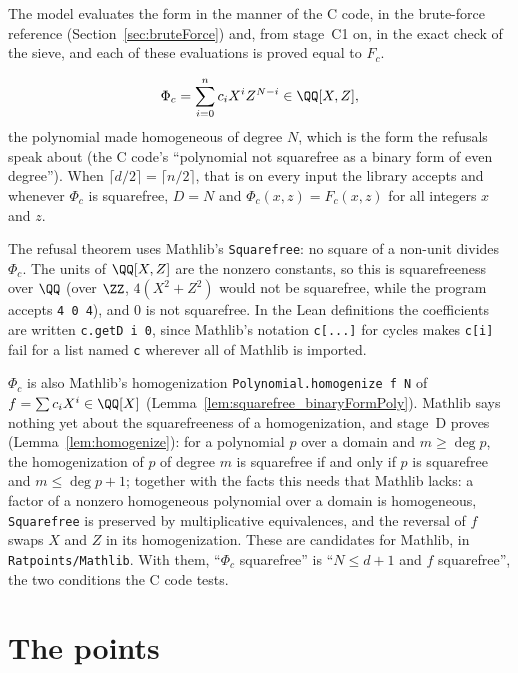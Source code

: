 The model evaluates the form in the manner of the C code, in the brute-force reference
(Section~\ref{sec:bruteForce}) and, from stage~C1 on, in the exact check of the sieve, and each of
these evaluations is proved equal to $F_c$.

\begin{definition}\label{def:binaryFormPoly}
  \leanok
  \[ \Phi_c = \sum_{i=0}^{n} c_i X^i Z^{N-i} \in \QQ[X, Z], \]
  the polynomial made homogeneous of degree $N$, which is the form the refusals speak about (the
  C code's ``polynomial not squarefree as a binary form of even degree''). When
  $\lceil d/2 \rceil = \lceil n/2 \rceil$, that is on every input the library accepts and whenever
  $\Phi_c$ is squarefree, $D = N$ and $\Phi_c(x, z) = F_c(x, z)$ for all integers $x$ and $z$.
\end{definition}

The refusal theorem uses Mathlib's \verb|Squarefree|: no square of a non-unit divides $\Phi_c$. The
units of $\QQ[X, Z]$ are the nonzero constants, so this is squarefreeness over $\QQ$ (over $\ZZ$,
$4(X^2 + Z^2)$ would not be squarefree, while the program accepts \verb|4 0 4|), and $0$ is not
squarefree. In the Lean definitions the coefficients are written \verb|c.getD i 0|, since Mathlib's
notation \verb|c[...]| for cycles makes \verb|c[i]| fail for a list named \verb|c| wherever all of
Mathlib is imported.

$\Phi_c$ is also Mathlib's homogenization \verb|Polynomial.homogenize f N| of
$f = \sum c_i X^i \in \QQ[X]$ (Lemma~\ref{lem:squarefree_binaryFormPoly}). Mathlib says nothing yet
about the squarefreeness of a homogenization, and stage~D proves (Lemma~\ref{lem:homogenize}): for a
polynomial $p$ over a domain and $m \ge \deg p$, the homogenization of $p$ of degree $m$ is
squarefree if and only if $p$ is squarefree and $m \le \deg p + 1$; together with the facts this
needs that Mathlib lacks: a factor of a nonzero homogeneous polynomial over a domain is homogeneous,
\verb|Squarefree| is preserved by multiplicative equivalences, and the reversal of $f$ swaps $X$ and
$Z$ in its homogenization. These are candidates for Mathlib, in \verb|Ratpoints/Mathlib|. With them,
``$\Phi_c$ squarefree'' is ``$N \le d + 1$ and $f$ squarefree'', the two conditions the C code
tests.

\section{The points}

